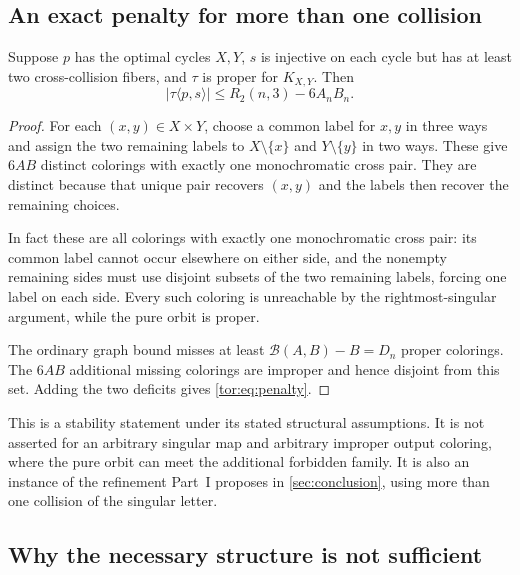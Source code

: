 \documentclass[11pt,a4paper]{article}
\numberwithin{equation}{section}
\theoremstyle{definition}
\theoremstyle{remark}
\newcommand{\Bip}{\mathcal B}
\begin{document}
\subsection{An exact penalty for more than one collision}

\begin{proposition}\label{tor:prop:rankpenalty}
Suppose $p$ has the optimal cycles $X,Y$, $s$ is injective on each cycle but
has at least two cross-collision fibers, and $\tau$ is proper for $K_{X,Y}$.
Then
\begin{equation}\label{tor:eq:penalty}
 |\tau\langle p,s\rangle|\le R_2(n,3)-6A_nB_n.
\end{equation}
\end{proposition}
\begin{proof}
For each $(x,y)\in X\times Y$, choose a common label for $x,y$ in three ways
and assign the two remaining labels to $X\setminus\{x\}$ and
$Y\setminus\{y\}$ in two ways. These give $6AB$ distinct colorings with
exactly one monochromatic cross pair. They are distinct because that unique
pair recovers $(x,y)$ and the labels then recover the remaining choices.

In fact these are all colorings with exactly one monochromatic cross pair:
its common label cannot occur elsewhere on either side, and the nonempty
remaining sides must use disjoint subsets of the two remaining labels, forcing
one label on each side. Every such coloring is unreachable by the
rightmost-singular argument, while the pure orbit is proper.

The ordinary graph bound misses at least $\Bip(A,B)-B=D_n$ proper colorings.
The $6AB$ additional missing colorings are improper and hence disjoint from
this set. Adding the two deficits gives \eqref{tor:eq:penalty}.
\end{proof}

This is a stability statement under its stated structural assumptions. It is
not asserted for an arbitrary singular map and arbitrary improper output
coloring, where the pure orbit can meet the additional forbidden family. It is
also an instance of the refinement Part~I proposes in \cref{sec:conclusion},
using more than one collision of the singular letter.

\subsection{Why the necessary structure is not sufficient}
\end{document}
